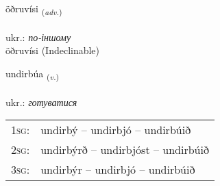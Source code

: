 \documentclass[frontgrid, backgrid]{flacards}\usepackage[]{graphicx}\usepackage[]{xcolor}
\begin{document}

\renewcommand{\flhead}{\vskip5pt \fboxsep=0pt {\small\bfseries\footnotesize Atviksorð | прислівник}}
\renewcommand{\fcfoot}{\vskip5pt \fboxsep=0pt \hspace{2pt}{\small\bfseries\footnotesize 2K}}

\renewcommand{\blhead}{\vskip5pt {\small\bfseries\footnotesize Atviksorð | прислівник }}
\renewcommand{\bcfoot}{\vskip5pt \hspace{2pt}{\small\bfseries\footnotesize 2K}}


{öðruvísi \small{\textsubscript{(\textit{adv.})}} \\[1ex]
\textphonetic{[œðrʏvisɪ]} \\
ukr.: \emph{по-іншому} \\  [2ex]
öðruvísi (Indeclinable)}

\renewcommand{\flhead}{\vskip5pt \fboxsep=0pt {\small\bfseries\footnotesize Sagnorð | дієслово}}
\renewcommand{\fcfoot}{\vskip5pt \fboxsep=0pt \hspace{2pt}{\small\bfseries\footnotesize 2K}}

\renewcommand{\blhead}{\vskip5pt {\small\bfseries\footnotesize Sagnorð | дієслово }}
\renewcommand{\bcfoot}{\vskip5pt \hspace{2pt}{\small\bfseries\footnotesize 2K}}


{undirbúa \small{\textsubscript{(\textit{v.})}} \\[1ex] %
 \\
ukr.: \emph{готуватися} \\  [2ex]
\renewcommand*{\arraystretch}{0.8}
\begin{tabular}{p{1cm}l}
\textsc{1sg}: & undirbý -- undirbjó -- undirbúið \\ 
\textsc{2sg}: & undirbýrð -- undirbjóst -- undirbúið \\ 
\textsc{3sg}: & undirbýr -- undirbjó -- undirbúið \\ 
\end{tabular}
}
\end{document}
